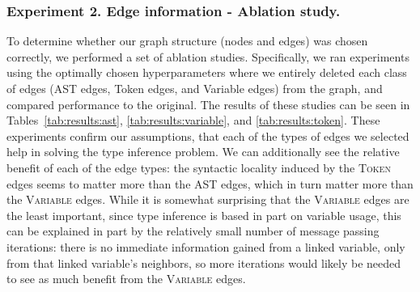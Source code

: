\subsubsection{Experiment 2. Edge information - Ablation study.}
To determine whether our graph structure (nodes and edges) was chosen correctly, we performed a set of ablation studies.
Specifically, we ran experiments using the optimally chosen hyperparameters where we entirely deleted each class of edges (AST edges, Token edges, and Variable edges) from the graph, and compared performance to the original.
The results of these studies can be seen in Tables~\ref{tab:results:ast}, \ref{tab:results:variable}, and \ref{tab:results:token}.
These experiments confirm our assumptions, that each of the types of edges we selected help in solving the type inference problem.
We can additionally see the relative benefit of each of the edge types: the syntactic locality induced by the \textsc{Token} edges seems to matter more than the AST edges, which in turn matter more than the \textsc{Variable} edges.
While it is somewhat surprising that the \textsc{Variable} edges are the least important, since type inference is based in part on variable usage, this can be explained in part by the relatively small number of message passing iterations: there is no immediate information gained from a linked variable, only from that linked variable's neighbors, so more iterations would likely be needed to see as much benefit from the \textsc{Variable} edges.

